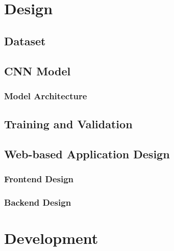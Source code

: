 \documentclass{BachelorBUI}
\begin{document}
\section{Design}
    \subsection{Dataset}
    \subsection{CNN Model}
        \subsubsection{Model Architecture}
    \subsection{Training and Validation}
    \subsection{Web-based Application Design}
        \subsubsection{Frontend Design}
        \subsubsection{Backend Design}
        
\section{Development}
\end{document}
